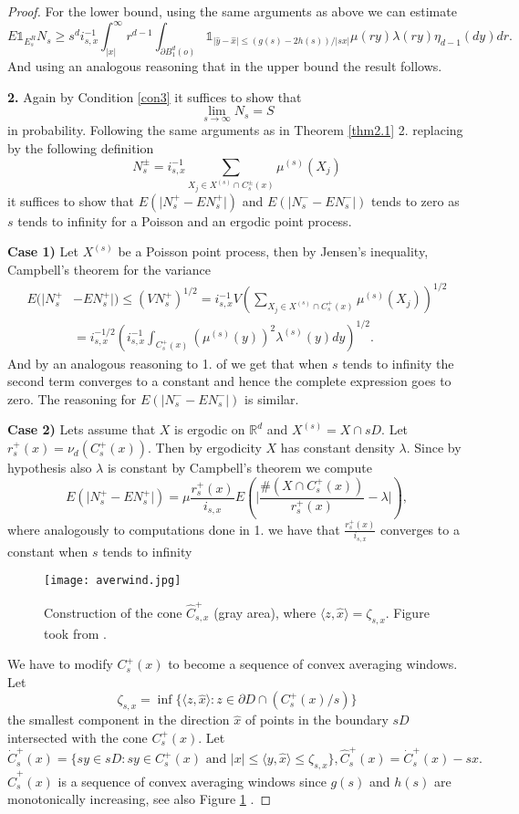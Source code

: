 \begin{proof}
For the lower bound, using the same arguments as above we can estimate
\small $$E\mathds{1}_{E^{R}_s}N_s\geq s^d i_{s, x}^{-1}\int_{\vert x\vert}^{\infty} r^{d-1}\int_{\partial B^d_1(o)}\mathds{1}_{\vert \hat{y}-\hat{x}\vert \leq (g(s)-2h(s))/\vert sx\vert}\mu(ry)\lambda(ry)\eta_{d-1}(dy)dr. $$
\normalsize And using an analogous reasoning that in the upper bound the result follows.

\textbf{2.} Again by Condition \ref{con3} it suffices to show that $$\lim_{s\rightarrow\infty}N_s=S $$ in probability. Following the same arguments as in Theorem \ref{thm2.1} 2. replacing by the following definition $$N^{\pm}_s=i_{s,x}^{-1}\sum_{X_j\in X^{(s)}\cap C^\pm_s(x)}\mu^{(s)}(X_j) $$ it suffices to show that $E(\vert N^+_s-EN^+_s\vert)$ and $E(\vert N^-_s-EN^-_s\vert)$ tends to zero as $s$ tends to infinity for a Poisson and an ergodic point process.

\textbf{Case 1)} Let $X^{(s)}$ be a Poisson point process, then by Jensen's inequality, Campbell's theorem for the variance
\begin{align}
E(\vert N_s^+&-EN_s^+\vert)\leq(VN^+_s)^{1/2}=i_{s,x}^{-1} V(\sum_{X_j\in X^{(s)}\cap C^+_s(x)}\mu^{(s)}(X_j))^{1/2}\nonumber\\
&=i^{-1/2}_{s,x}(i^{-1}_{s,x}\int_{C^+_s(x)}(\mu^{(s)}(y))^2\lambda^{(s)}(y)dy)^{1/2}\nonumber.
\end{align}
And by an analogous reasoning to 1. of we get that when $s$ tends to infinity the second term converges to a constant and hence the complete expression goes to zero. The reasoning for $E(\vert N_s^--EN_s^-\vert)$ is similar.

\textbf{Case 2)} Lets assume that $X$ is ergodic on $\mathbb{R}^d$ and $X^{(s)}=X\cap sD$. Let $r^+_s(x)=\nu_d(C^+_s(x))$. Then by ergodicity $X$ has constant density $\lambda$. Since by hypothesis also $\lambda$ is constant by Campbell's theorem we compute $$E(\vert N_s^+-EN_s^+\vert)=\mu\frac{r^+_s(x)}{i_{s, x}}E(\vert\frac{\#(X\cap C^+_s(x))}{r^+_s(x)}-\lambda\vert), $$ where analogously to computations done in 1. we have that $\frac{r^+_s(x)}{i_{s, x}}$ converges to a constant when $s$ tends to infinity
\begin{figure}
\captionsetup{width=1\textwidth}
\centering
\texttt{[image: averwind.jpg]}
\caption{Construction of the cone $\hat{C}^+_{s,x}$ (gray area), where $\langle z, \hat{x}\rangle=\zeta_{s,x}$. Figure took from \cite{WIAS}.}
\label{fig3.4}
\end{figure}
We have to modify $C_s^+(x)$ to become a sequence of convex averaging windows. Let $$\zeta_{s,x}=\inf\lbrace\langle z, \hat{x}\rangle: z\in\partial D\cap(C^+_s(x)/s)\rbrace$$ the smallest component in the direction $\hat{x}$ of points in the boundary $sD$ intersected with the cone $C_s^+(x)$. 
Let $$\dot{C}^+_s(x)=\lbrace sy\in sD: sy\in C^+_s(x)\mbox{ and }\vert x\vert\leq\langle y,\hat{x}\rangle\leq\zeta_{s,x}\rbrace,\hat{C}^+_s(x)=\dot{C}^+_s(x)-sx.$$ $\hat{C}^+_s(x)$ is a sequence of convex averaging windows since $g(s)$ and $h(s)$ are monotonically increasing, see also Figure \ref{fig3.4} .


\end{proof}

